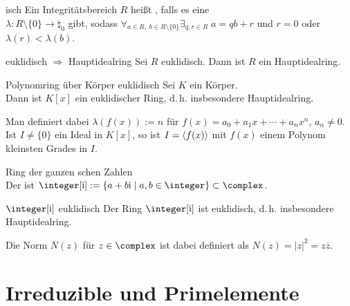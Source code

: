 \linie

\begin{Def}{isch}
    Ein Integritätsbereich $R$ heißt , falls
    es eine \\
    $\lambda\colon R \setminus \{0\} \rightarrow \natural_0$ gibt, sodass
    $\forall_{a \in R,\; b \in R \setminus \{0\}} \exists_{q, r \in R}\;
    a = qb + r$ und $r = 0$ oder $\lambda(r) < \lambda(b)$.
\end{Def}

\begin{Theorem}{euklidisch $\Rightarrow$ Hauptidealring}
    Sei $R$ euklidisch.
    Dann ist $R$ ein Hauptidealring.
\end{Theorem}

\linie

\begin{Prop}{Polynomring über Körper euklidisch}
    Sei $K$ ein Körper.\\
    Dann ist $K[x]$ ein euklidischer Ring, d.\,h. insbesondere Hauptidealring.
\end{Prop}

\begin{Bem}
    Man definiert dabei $\lambda(f(x)) := n$
    für $f(x) = a_0 + a_1 x + \dotsb + a_n x^n$, $a_n \not= 0$.
    Ist $I \not= \{0\}$ ein Ideal in $K[x]$, so ist
    $I = \left\langle f(x)\right\rangle$ mit $f(x)$ einem Polynom kleinsten Grades in $I$.
\end{Bem}

\begin{Def}{Ring der ganzen schen Zahlen}\\
    Der  ist
    $\integer[\i] := \{a + b\i \;|\; a, b \in \integer\} \subset \complex$.
\end{Def}

\begin{Prop}{$\integer[\i]$ euklidisch}
    Der Ring $\integer[\i]$ ist euklidisch, d.\,h. insbesondere Hauptidealring.
\end{Prop}

\begin{Bem}
    Die Norm $N(z)$ für $z \in \complex$ ist dabei definiert als
    $N(z) = |z|^2 = z \overline{z}$.
\end{Bem}

\section{%
    Irreduzible und Primelemente%
}


